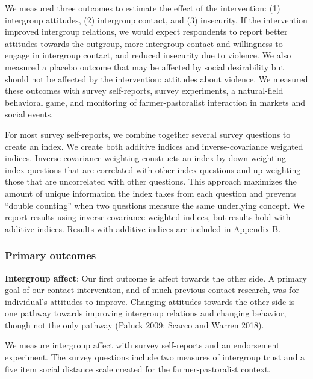 \documentclass[11pt]{article}
\begin{document}
We measured three outcomes to estimate the effect of the intervention:
(1) intergroup attitudes, (2) intergroup contact, and (3) insecurity. If
the intervention improved intergroup relations, we would expect
respondents to report better attitudes towards the outgroup, more
intergroup contact and willingness to engage in intergroup contact, and
reduced insecurity due to violence. We also measured a placebo outcome
that may be affected by social desirability but should not be affected
by the intervention: attitudes about violence. We measured these
outcomes with survey self-reports, survey experiments, a natural-field
behavioral game, and monitoring of farmer-pastoralist interaction in
markets and social events.

For most survey self-reports, we combine together several survey
questions to create an index. We create both additive indices and
inverse-covariance weighted indices. Inverse-covariance weighting
constructs an index by down-weighting index questions that are
correlated with other index questions and up-weighting those that are
uncorrelated with other questions. This approach maximizes the amount of
unique information the index takes from each question and prevents
``double counting'' when two questions measure the same underlying
concept. We report results using inverse-covariance weighted indices,
but results hold with additive indices. Results with additive indices
are included in Appendix B.

\hypertarget{primary-outcomes}{%
\subsubsection{Primary outcomes}\label{primary-outcomes}}

\textbf{Intergroup affect}: Our first outcome is affect towards the
other side. A primary goal of our contact intervention, and of much
previous contact research, was for individual's attitudes to improve.
Changing attitudes towards the other side is one pathway towards
improving intergroup relations and changing behavior, though not the
only pathway (Paluck 2009; Scacco and Warren 2018).

We measure intergroup affect with survey self-reports and an endorsement
experiment. The survey questions include two measures of intergroup
trust and a five item social distance scale created for the
farmer-pastoralist context.
\end{document}
